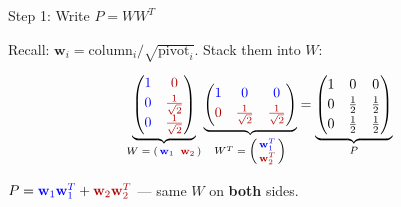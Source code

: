 \documentclass[10pt]{beamer}
\theoremstyle{definition}
\newcommand{\x}[1]{\alert{\textbf{#1}}}
\newcommand{\bl}[1]{{\color{blue}#1}}                 %
\newcommand{\rd}[1]{{\color{red!70!black}#1}}         %
\begin{document}
\begin{frame}{Step 1: Write $P = WW^T$}

Recall: $\mathbf{w}_i = \text{column}_i / \sqrt{\text{pivot}_i}$. \quad Stack them into $W$:

$$\underbrace{\begin{pmatrix}
\bl{1} & \rd{0} \\[2pt]
\bl{0} & \rd{\frac{1}{\sqrt{2}}} \\[2pt]
\bl{0} & \rd{\frac{1}{\sqrt{2}}}
\end{pmatrix}}_{W\;=\;(\,\bl{\mathbf{w}_1}\;\;\rd{\mathbf{w}_2}\,)}
\underbrace{\begin{pmatrix}
\bl{1} & \bl{0} & \bl{0} \\[2pt]
\rd{0} & \rd{\frac{1}{\sqrt{2}}} & \rd{\frac{1}{\sqrt{2}}}
\end{pmatrix}}_{W^T\;=\;\left(\begin{smallmatrix} \bl{\mathbf{w}_1^T} \\ \rd{\mathbf{w}_2^T} \end{smallmatrix}\right)}
=
\underbrace{\begin{pmatrix}
1 & 0 & 0 \\[2pt]
0 & \frac{1}{2} & \frac{1}{2} \\[2pt]
0 & \frac{1}{2} & \frac{1}{2}
\end{pmatrix}}_{P}$$

\vspace{0.5em}

$P = \bl{\mathbf{w}_1}\bl{\mathbf{w}_1^T} + \rd{\mathbf{w}_2}\rd{\mathbf{w}_2^T}$ \quad --- same $W$ on \x{both} sides.

\end{frame}
\end{document}
